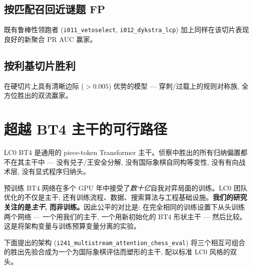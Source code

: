 \documentclass[10pt,a4paper]{article}
\begin{document}
\subsection*{按匹配召回近谜题 FP}
既有鲁棒性领跑者 (\texttt{i011\_vetoselect}, \texttt{i012\_dykstra\_lcp}) 加上同样在该切片表现良好的新聚合 PR AUC 赢家。

\subsection*{按利基切片胜利}
在硬切片上具有清晰边际 ($>0.005$) 优势的模型 --- 穿刺/过载上的规则对称族, 全方位胜出的双流赢家。

\clearpage
\section{超越 BT4 主干的可行路径}

LC0 BT4 是通用的 piece-token Transformer 主干。侦察中胜出的所有归纳偏置都不在其主干中 --- 没有兑子/王安全分解, 没有国际象棋自同构等变性, 没有有向战术层, 没有显式程序归纳头。

\begin{tcolorbox}[goodcallout, title=对比的范围]
预训练 BT4 网络在多个 GPU 年中接受了\emph{数十亿}自我对弈局面的训练。LC0 团队优化的不仅是主干, 还有训练流程、数据、搜索算法与工程基础设施。\textbf{我们的研究关注的是\emph{主干}, 而非训练。}因此公平的对比是: 在完全相同的训练设置下从头训练两个网络 --- 一个用我们的主干, 一个用新初始化的 BT4 形状主干 --- 然后比较。这是将架构变量与训练预算变量分离的实验。
\end{tcolorbox}

下面提出的架构 (\texttt{i241\_multistream\_attention\_chess\_eval}) 将三个相互可组合的胜出先验合成为一个为国际象棋评估而塑形的主干, 配以标准 LC0 风格的双头。

\medskip
\end{document}
